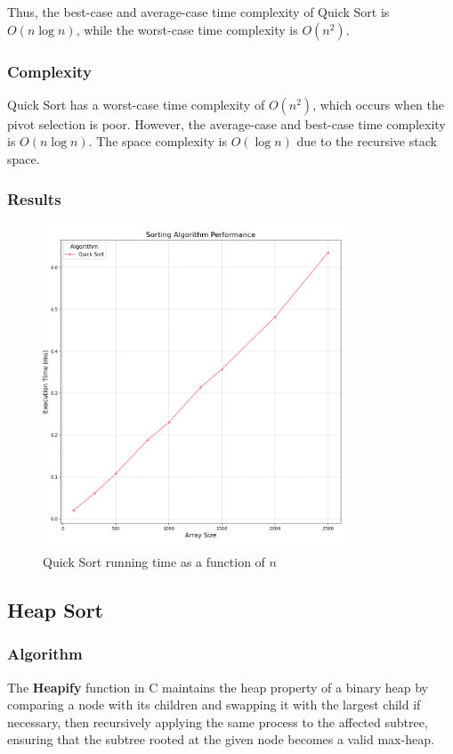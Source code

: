 \documentclass{article}
\begin{document}
Thus, the best-case and average-case time complexity of Quick Sort is \newline $O(n \log n)$, while the worst-case time complexity is $O(n^2)$.

\subsubsection{Complexity}
Quick Sort has a worst-case time complexity of $O(n^2)$, which occurs when the pivot selection is poor. However, the average-case and best-case time complexity is $O(n \log n)$. The space complexity is $O(\log n)$ due to the recursive stack space.

\subsubsection{Results}
\begin{figure}[H]
	\includegraphics[width=0.8\textwidth]{images/quick_sort.png}
	\caption{Quick Sort running time as a function of $n$}
\end{figure}


\subsection{Heap Sort}

\subsubsection{Algorithm}
The \textbf{Heapify} function in C maintains the heap property of a binary heap by comparing a node with its children and swapping it with the largest child if necessary, then recursively applying the same process to the affected subtree, ensuring that the subtree rooted at the given node becomes a valid max-heap.
\end{document}
